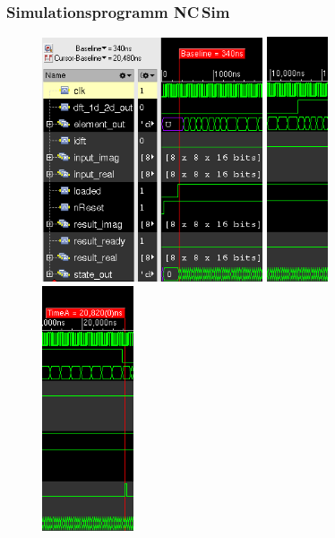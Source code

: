\begin{frame}\frametitle{Simulationsprogramm NC\,Sim}
  \begin{figure}[htbp]
  \centering
  \includegraphics[width=0.58\textwidth]{img/Simulationsdauer_Anfang.png}
  \hfill
  \includegraphics[width=0.161\textwidth]{img/Simulationsdauer_Mitte.png}
  \hfill
  \includegraphics[width=0.241\textwidth]{img/Simulationsdauer_Ende.png}
 \end{figure}
\end{frame}

